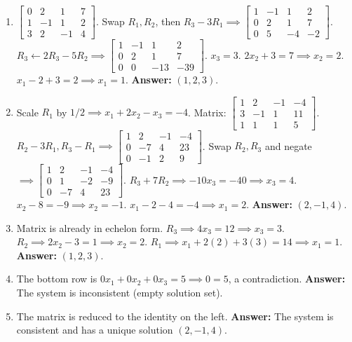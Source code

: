 \documentclass[11pt]{article}
\begin{document}
\begin{enumerate}[label=\textbf{Sol 1.1.\arabic*}]
    \item $\left[\begin{array}{ccc|c} 0 & 2 & 1 & 7 \\ 1 & -1 & 1 & 2 \\ 3 & 2 & -1 & 4 \end{array}\right]$. Swap $R_1, R_2$, then $R_3-3R_1 \implies \left[\begin{array}{ccc|c} 1 & -1 & 1 & 2 \\ 0 & 2 & 1 & 7 \\ 0 & 5 & -4 & -2 \end{array}\right]$. $R_3 \leftarrow 2R_3 - 5R_2 \implies \left[\begin{array}{ccc|c} 1 & -1 & 1 & 2 \\ 0 & 2 & 1 & 7 \\ 0 & 0 & -13 & -39 \end{array}\right]$. $x_3=3$. $2x_2+3=7 \implies x_2=2$. $x_1-2+3=2 \implies x_1=1$. \textbf{Answer:} $(1, 2, 3)$.
    \item Scale $R_1$ by $1/2 \implies x_1 + 2x_2 - x_3 = -4$. Matrix: $\left[\begin{array}{ccc|c} 1 & 2 & -1 & -4 \\ 3 & -1 & 1 & 11 \\ 1 & 1 & 1 & 5 \end{array}\right]$. $R_2-3R_1, R_3-R_1 \implies \left[\begin{array}{ccc|c} 1 & 2 & -1 & -4 \\ 0 & -7 & 4 & 23 \\ 0 & -1 & 2 & 9 \end{array}\right]$. Swap $R_2, R_3$ and negate $\implies \left[\begin{array}{ccc|c} 1 & 2 & -1 & -4 \\ 0 & 1 & -2 & -9 \\ 0 & -7 & 4 & 23 \end{array}\right]$. $R_3+7R_2 \implies -10x_3 = -40 \implies x_3=4$. $x_2 - 8 = -9 \implies x_2 = -1$. $x_1 - 2 - 4 = -4 \implies x_1 = 2$. \textbf{Answer:} $(2, -1, 4)$.
    \item Matrix is already in echelon form. $R_3 \implies 4x_3 = 12 \implies x_3=3$. $R_2 \implies 2x_2 - 3 = 1 \implies x_2 = 2$. $R_1 \implies x_1 + 2(2) + 3(3) = 14 \implies x_1 = 1$. \textbf{Answer:} $(1, 2, 3)$.
    \item The bottom row is $0x_1 + 0x_2 + 0x_3 = 5 \implies 0 = 5$, a contradiction. \textbf{Answer:} The system is inconsistent (empty solution set).
    \item The matrix is reduced to the identity on the left. \textbf{Answer:} The system is consistent and has a unique solution $(2, -1, 4)$.

\end{enumerate}
\end{document}
